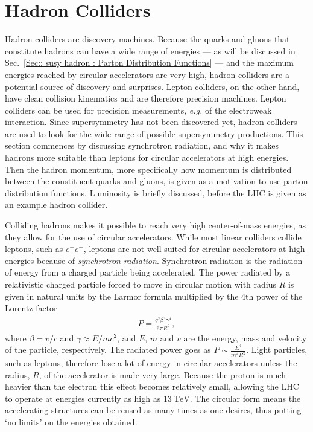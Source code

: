 \documentclass[twoside,english]{uiofysmaster}
\begin{document}
{\section{Hadron Colliders}\label{Sec:: susy hadron : Hadron Colliders}

Hadron colliders are discovery machines. Because the quarks and gluons that constitute hadrons can have a wide range of energies --- as will be discussed in Sec.~\ref{Sec:: susy hadron : Parton Distribution Functions} --- and the maximum energies reached by circular accelerators are very high, hadron colliders are a potential source of discovery and surprises. Lepton colliders, on the other hand, have clean collision kinematics and are therefore precision machines. Lepton colliders can be used for precision measurements, \textit{e.g.} of the electroweak interaction. Since supersymmetry has not been discovered yet, hadron colliders are used to look for the wide range of possible supersymmetry productions. This section commences by discussing synchrotron radiation, and why it makes hadrons more suitable than leptons for circular accelerators at high energies. Then the hadron momentum, more specifically how momentum is distributed between the constituent quarks and gluons, is given as a motivation to use parton distribution functions. Luminosity is briefly discussed, before the LHC is given as an example hadron collider.  


Colliding hadrons makes it possible to reach very high center-of-mass energies, as they allow for the use of circular accelerators. While most linear colliders collide leptons, such as $e^- e^+$, leptons are not well-suited for circular accelerators at high energies because of \textit{synchrotron radiation}. Synchrotron radiation is the radiation of energy from a charged particle being accelerated. The power radiated by a relativistic charged particle forced to move in circular motion with radius $R$ is given in natural units by the Larmor formula \cite{larmor1897lxiii} multiplied by the 4th power of the Lorentz factor
\begin{align}
P = \frac{q^2 \beta^4 \gamma^4}{6 \pi R^2},
\end{align}
where $\beta = v/c$ and $\gamma \approx E/mc^2$, and $E$, $m$ and $v$ are the energy, mass and velocity of the particle, respectively. The radiated power goes as $P \sim \frac{E^4}{m^4 R^2}$. Light particles, such as leptons, therefore lose a lot of energy in circular accelerators unless the radius, $R$, of the accelerator is made very large. Because the proton is much heavier than the electron this effect becomes relatively small, allowing the LHC to operate at energies currently as high as $13~\mathrm{TeV}$. The circular form means the accelerating structures can be reused as many times as one desires, thus putting `no limits' on the energies obtained. 

}
\end{document}
